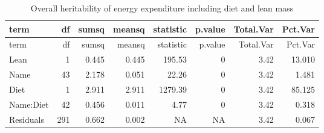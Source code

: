 \documentclass[]{article}
\newenvironment{Shaded}{\begin{snugshade}}{\end{snugshade}}
\newcommand{\DataTypeTok}[1]{\textcolor[rgb]{0.13,0.29,0.53}{#1}}
\newcommand{\DecValTok}[1]{\textcolor[rgb]{0.00,0.00,0.81}{#1}}
\newcommand{\KeywordTok}[1]{\textcolor[rgb]{0.13,0.29,0.53}{\textbf{#1}}}
\newcommand{\NormalTok}[1]{#1}
\newcommand{\OperatorTok}[1]{\textcolor[rgb]{0.81,0.36,0.00}{\textbf{#1}}}
\newcommand{\StringTok}[1]{\textcolor[rgb]{0.31,0.60,0.02}{#1}}
\begin{document}
\begin{Shaded}
\end{Shaded}

\begin{longtable}[]{@{}lrrrrrrr@{}}
\caption{Overall heritability of energy expenditure including diet and
lean mass}\tabularnewline
\toprule
term & df & sumsq & meansq & statistic & p.value & Total.Var &
Pct.Var\tabularnewline
\midrule
\endfirsthead
\toprule
term & df & sumsq & meansq & statistic & p.value & Total.Var &
Pct.Var\tabularnewline
\midrule
\endhead
Lean & 1 & 0.445 & 0.445 & 195.53 & 0 & 3.42 & 13.010\tabularnewline
Name & 43 & 2.178 & 0.051 & 22.26 & 0 & 3.42 & 1.481\tabularnewline
Diet & 1 & 2.911 & 2.911 & 1279.39 & 0 & 3.42 & 85.125\tabularnewline
Name:Diet & 42 & 0.456 & 0.011 & 4.77 & 0 & 3.42 & 0.318\tabularnewline
Residuals & 291 & 0.662 & 0.002 & NA & NA & 3.42 & 0.067\tabularnewline
\bottomrule
\end{longtable}

\begin{Shaded}
\end{Shaded}
\end{document}

